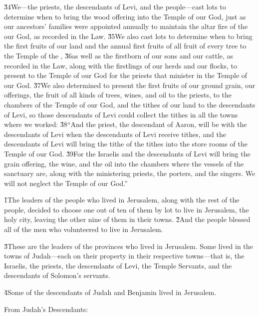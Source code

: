 \v{34}We---the priests, the descendants of Levi, and the people---cast lots to determine when to bring the wood offering into the Temple of our God, just as our ancestors' families were appointed annually to maintain the altar fire of the  our God, as recorded in the Law. \v{35}We also cast lots to determine when to bring the first fruits of our land and the annual first fruits of all fruit of every tree to the Temple of the , \v{36}as well as the firstborn of our sons and our cattle, as recorded in the Law, along with the firstlings of our herds and our flocks, to present to the Temple of our God for the priests that minister in the Temple of our God. \v{37}We also determined to present the first fruits of our ground grain, our offerings, the fruit of all kinds of trees, wines, and oil to the priests, to the chambers of the Temple of our God, and the tithes of our land to the descendants of Levi, so those descendants of Levi could collect the tithes in all the towns where we worked: \v{38}``And the priest, the descendant of Aaron, will be with the descendants of Levi when the descendants of Levi receive tithes, and the descendants of Levi will bring the tithe of the tithes into the store rooms of the Temple of our God. \v{39}For the Israelis and the descendants of Levi will bring the grain offering, the wine, and the oil into the chambers where the vessels of the sanctuary are, along with the ministering priests, the porters, and the singers. We will not neglect the Temple of our God.''

\v{1}The leaders of the people who lived in Jerusalem, along with the rest of the people, decided to choose one out of ten of them by lot to live in Jerusalem, the holy city, leaving the other nine of them in their towns. \v{2}And the people blessed all of the men who volunteered to live in Jerusalem.

\v{3}These are the leaders of the provinces who lived in Jerusalem. Some lived in the towns of Judah---each on their property in their respective towns---that is, the Israelis, the priests, the descendants of Levi, the Temple Servants, and the descendants of Solomon's servants.

\v{4}Some of the descendants of Judah and Benjamin lived in Jerusalem.

From Judah's Descendants:

